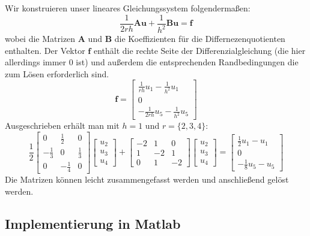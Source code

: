	Wir konstruieren unser lineares Gleichungssystem folgendermaßen:
	\begin{equation}
	\frac{1}{2rh} \mathbf{A} \mathbf{u} + \frac{1}{h^2}\mathbf{B}  \mathbf{u} = \mathbf{f}
	\end{equation}
	wobei die Matrizen $\mathbf{A}$ und $\mathbf{B}$ die Koeffizienten für die Differnezenquotienten enthalten. Der Vektor $\mathbf{f}$ enthält die rechte Seite der Differenzialgleichung (die hier allerdings immer 0 ist) und außerdem die entsprechenden Randbedingungen die zum Lösen erforderlich sind.
	\begin{equation}
	\mathbf{f} = \begin{bmatrix}
	\frac{1}{rh} u_1  - \frac{1}{h^2} u_1 \\
	0 \\
	-\frac{1}{2rh} u_5  - \frac{1}{h^2} u_5 
	\end{bmatrix}
	\end{equation}
	Ausgeschrieben erhält man mit $h=1$ und $r=\{2,3,4\}$:
	\begin{equation}
	\frac{1}{2}
	\begin{bmatrix}
	0 & \frac{1}{2} & 0 \\ 
	-\frac{1}{3} & 0 & \frac{1}{3} \\ 
	0 & -\frac{1}{4} & 0
	\end{bmatrix}   
	\begin{bmatrix}
	u_2\\
	u_3\\
	u_4
	\end{bmatrix} +   \begin{bmatrix}
	-2 & 1 & 0 \\ 
	1 & -2 & 1 \\ 
	0 & 1 & -2
	\end{bmatrix}  \begin{bmatrix}
	u_2\\
	u_3\\
	u_4
	\end{bmatrix} = \begin{bmatrix}
	\frac{1}{2} u_1  -  u_1 \\
	0 \\
	-\frac{1}{8} u_5  -  u_5 
	\end{bmatrix}
	\end{equation}
	Die Matrizen können leicht zusammengefasst werden und anschließend gelöst werden.


	\subsection{Implementierung in Matlab}
	
	
